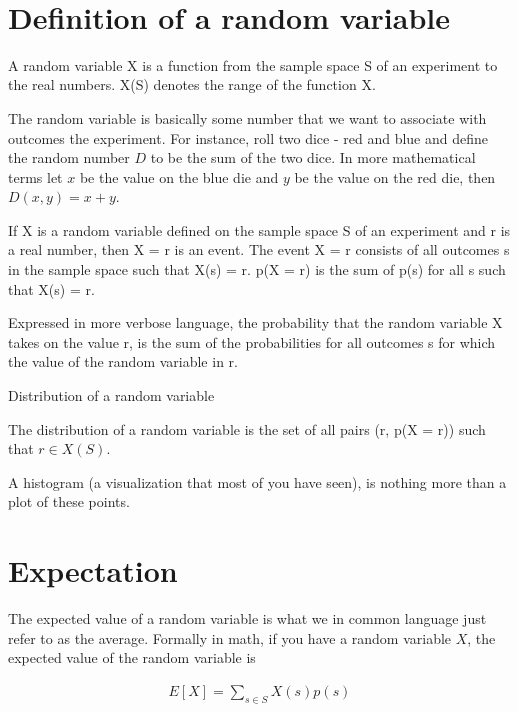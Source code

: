 \documentclass[12pt]{article}
\begin{document}
\begin{center}
\\
\vspace{1cm}
\end{center}

\vspace{0.5cm}\noindent


\section*{Definition of a random variable}
A random variable X is a function from the sample space S of an experiment to the real numbers. X(S) denotes the range of the function X. 

The random variable is basically some number that we want to associate with outcomes the experiment. For instance, roll two dice - red and blue and define the random number $D$ to be the sum of the two dice. In more mathematical terms let $x$ be the value on the blue die and $y$ be the value on the red die, then $D(x,y) = x+y$.

If X is a random variable defined on the sample space S of an experiment and r is a real number, then X = r is an event. The event X = r consists of all outcomes s in the sample space such that X(s) = r. p(X = r) is the sum of p(s) for all s such that X(s) = r. 

Expressed in more verbose language, the probability that the random variable X takes on the value r, is the sum of the probabilities for all outcomes s for which the value of the random variable in r. 

Distribution of a random variable

The distribution of a random variable is the set of all pairs (r, p(X = r)) such that $r \in X(S)$.

A histogram (a visualization that most of you have seen), is nothing more than a plot of these points. 

\section*{Expectation}
The expected value of a random variable is what we in common language just refer to as the average. Formally in math, if you have a random variable $X$, the expected value of the random variable is

\begin{align*}
E[X] = \sum_{s \in S}X(s)p(s)
\end{align*}
\end{document}
